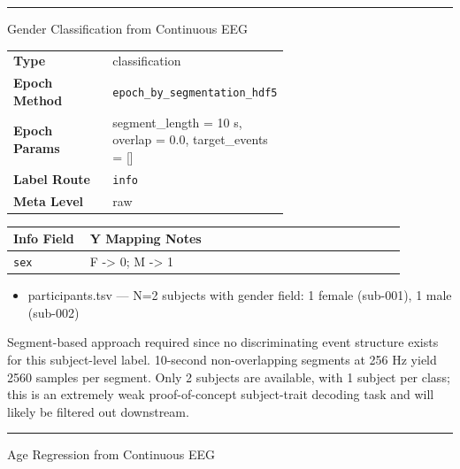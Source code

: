 {\begin{tcolorbox}
\noindent\rule{\linewidth}{0.4pt}\par\nopagebreak
{} {\footnotesize Gender Classification from Continuous EEG}\par\smallskip
{\footnotesize\begin{tabular}{@{}lp{0.62\linewidth}@{}}
\textbf{Type} & classification \\
\textbf{Epoch Method} & \texttt{epoch\_by\_segmentation\_hdf5} \\
\textbf{Epoch Params} & segment\_length = 10 s, overlap = 0.0, target\_events = [] \\
\textbf{Label Route} & \texttt{info} \\
\textbf{Meta Level} & raw \\
\end{tabular}}
\par{}\par\smallskip
\begingroup\footnotesize
\begin{tabular}{@{}p{0.1760\linewidth}p{0.7040\linewidth}@{}}
\toprule
\textbf{Info Field} & \textbf{Y Mapping Notes} \\
\midrule
\texttt{sex} & F -> 0; M -> 1 \\
\bottomrule
\end{tabular}
\endgroup
\par{}\par
\begin{itemize}[leftmargin=1.3em,noitemsep,topsep=1pt]
\item[\scriptsize$\cdot$] {\scriptsize participants.tsv --- N=2 subjects with gender field: 1 female (sub-001), 1 male (sub-002)}
\end{itemize}
\par{} {\footnotesize Segment-based approach required since no discriminating event structure exists for this subject-level label. 10-second non-overlapping segments at 256 Hz yield 2560 samples per segment. Only 2 subjects are available, with 1 subject per class; this is an extremely weak proof-of-concept subject-trait decoding task and will likely be filtered out downstream.}
\noindent\rule{\linewidth}{0.4pt}\par\nopagebreak
{} {\footnotesize Age Regression from Continuous EEG}\par\smallskip
{\footnotesize\begin{tabular}{@{}lp{0.62\linewidth}@{}}

\end{tabular}}
\end{tcolorbox}}
